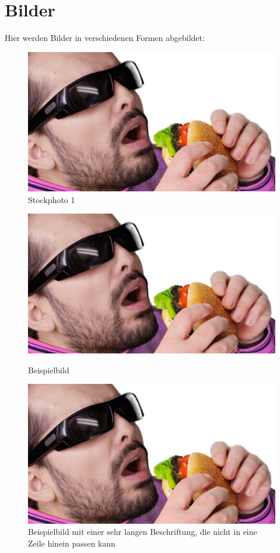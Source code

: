 \documentclass[12pt]{article}
\begin{document}
\section{Bilder}
Hier werden Bilder in verschiedenen Formen abgebildet:
\begin{figure}[ht]
	\centering
	\includegraphics[width=.85\textwidth]{stockphoto1.jpg}
	\caption{Stockphoto 1}
	\label{fig1}
\end{figure}
\begin{figure}[ht]
    \centering
    \begin{minipage}[t]{0.45\linewidth}
        \centering
        \includegraphics[width=.75\linewidth]{stockphoto1.jpg}
        \caption{Beispielbild}
    \end{minipage}%
    \hfill
    \begin{minipage}[t]{0.45\linewidth}
        \centering
        \includegraphics[width=\linewidth]{stockphoto1.jpg}
        \caption{Beispielbild mit einer sehr langen Beschriftung, die nicht in eine Zeile hinein passen kann}
    \end{minipage}
\end{figure}
\end{document}
